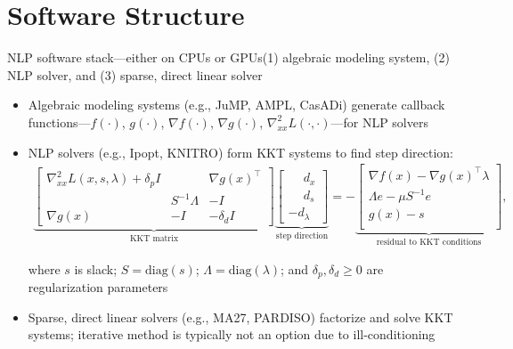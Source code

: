 \documentclass[aspectratio=169,11pt]{beamer}
\begin{document}
\section{Software Structure}
\newcommand{\kktsystem}{%
  \begin{align*}
    \underbrace{
    \begin{bmatrix}
      \nabla^2_{x x} L(x,s,\lambda) + \delta_p I & & \nabla g(x)^\top
      \\ & S^{-1}\Lambda &  -I
      \\ \nabla g(x) & -I &  - \delta_d I
    \end{bmatrix}
    }_{\text{KKT matrix}}
    \underbrace{
    \begin{bmatrix}
      \phantom{-}d_x \\
      \phantom{-}d_s \\
      -d_\lambda
    \end{bmatrix}}_{\text{step direction}} =
    -\underbrace{\begin{bmatrix}
      \nabla f(x) - \nabla g(x)^\top \lambda\\
      \Lambda e - \mu S^{-1}e \\
      g(x) - s\\
    \end{bmatrix}}_{\text{residual to KKT conditions}},
  \end{align*}
}
\begin{frame}{NLP software stack---either on CPUs or GPUs}{{(1) algebraic modeling system}, {(2) NLP solver}, and {(3) sparse, direct linear solver}}
  \begin{itemize}
  \item<2-> \alert{Algebraic modeling systems} (e.g., JuMP, AMPL, CasADi) generate \alert{callback functions---$f(\cdot)$, $g(\cdot)$, $\nabla f(\cdot)$, $\nabla g(\cdot)$, $\nabla^2_{xx} L(\cdot,\cdot)$}---for \alert{NLP solvers}
  \item<3-> \alert{NLP solvers} (e.g., Ipopt, KNITRO) form \alert{KKT systems} to find step direction:
  \kktsystem
    where $s$ is slack; $S=\text{diag}(s)$; $\Lambda=\text{diag}(\lambda)$; and $\delta_p,\delta_d\geq 0$ are regularization parameters
  \item<4-> \alert{Sparse, direct linear solvers} (e.g., MA27, PARDISO) factorize and solve KKT systems; iterative method is typically not an option due to \alert{ill-conditioning}
  \end{itemize}
\end{frame}
\end{document}
